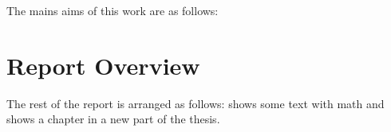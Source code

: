  

The mains aims of this work are as follows:
\blindenumerate




\section{Report Overview}
\label{sec:intro_report_overview}
The rest of the report is arranged as follows:  shows some text with math and  shows a chapter in a new part of the thesis.



